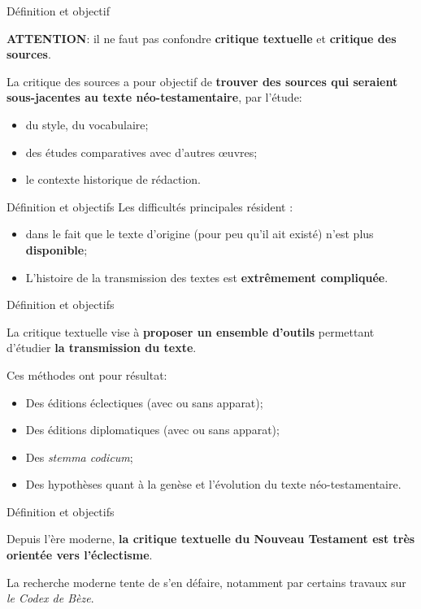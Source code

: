 \documentclass[11pt]{beamer}
\begin{document}
\begin{frame}{Définition et objectif}
    \begin{alertblock}{}
\textbf{ATTENTION}: il ne faut pas confondre \textbf{critique textuelle} et \textbf{critique des sources}.
    \end{alertblock}
La critique des sources a pour objectif de \textbf{trouver des sources qui seraient sous-jacentes au texte néo-testamentaire}, par l'étude:
\begin{itemize}
    \item du style, du vocabulaire;
    \item des études comparatives avec d'autres \oe{}uvres;
    \item le contexte historique de rédaction.
\end{itemize}
\end{frame}
\begin{frame}{Définition et objectifs}
    Les difficultés principales résident :
    \begin{itemize}
        \item dans le fait que le texte d'origine (pour peu qu'il ait existé) n'est plus \textbf{disponible};
        \item L'histoire de la transmission des textes est \textbf{extrêmement compliquée}.
    \end{itemize}
    
\end{frame}


\begin{frame}{Définition et objectifs}

    \begin{alertblock}{}
La critique textuelle vise à \textbf{proposer un ensemble d'outils} permettant d'étudier \textbf{la transmission du texte}.
    \end{alertblock}

Ces méthodes ont pour résultat:
\begin{itemize}
    \item Des éditions éclectiques (avec ou sans apparat);
    \item Des éditions diplomatiques (avec ou sans apparat);
    \item Des \textit{stemma codicum};
    \item Des hypothèses quant à la genèse et l'évolution du texte néo-testamentaire.
\end{itemize}
\end{frame}

\begin{frame}{Définition et objectifs}
    \begin{alertblock}{}
Depuis l'ère moderne, \textbf{la critique textuelle du Nouveau Testament est très orientée vers l’éclectisme}.
    \end{alertblock}

La recherche moderne tente de s'en défaire, notamment par certains travaux sur \emph{le Codex de Bèze}.
\end{frame}
\end{document}
